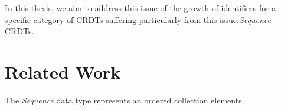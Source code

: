 \documentclass[sigplan]{acmart}
\begin{document}
In this thesis, we aim to address this issue of the growth of identifiers for a specific category of \acp{CRDT} suffering particularly from this issue:\emph{Sequence} \acp{CRDT}.

\section{Related Work}



The \emph{Sequence} data type represents an ordered collection elements. %
\end{document}
